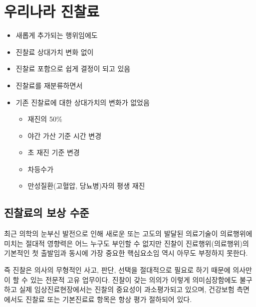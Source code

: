 \section{우리나라 진찰료}
\begin{itemize}\tightlist
\item 새롭게 추가되는 행위임에도 
\item 진찰료 상대가치 변화 없이 
\item 진찰료 포함으로 쉽게 결정이 되고 있음
\item 진찰료를 재분류하면서
\item 기존 진찰료에 대한 상대가치의 변화가 없었음
	\begin{itemize}\tightlist
	\item 재진의 50\%
	\item 야간 가산 기준 시간 변경
	\item 초 재진 기준 변경
	\item 차등수가
	\item 만성질환(고혈압, 당뇨병)자의 평생 재진
	\end{itemize}
\end{itemize}

\subsection{진찰료의 보상 수준}
최근 의학의 눈부신 발전으로 인해 새로운 또는 고도의 발달된 의료기술이 의료행위에 미치는 절대적 영향력은 어느 누구도 부인할 수 없지만 진찰이 진료행위(의료행위)의 기본적인 첫 출발임과 동시에 가장 중요한 핵심요소임 역시 아무도 부정하지 못한다. \par

즉 진찰은 의사의 무형적인 사고, 판단, 선택을 절대적으로 필요로 하기 때문에 의사만이 할 수 있는 전문적 고유 업무이다. 
진찰이 갖는 의의가 이렇게 의미심장함에도 불구하고 실제 임상진료현장에서는 진찰의 중요성이 과소평가되고 있으며, 건강보험 측면에서도 진찰료 또는 기본진료료 항목은 항상 평가 절하되어 있다. \PAR \medskip


